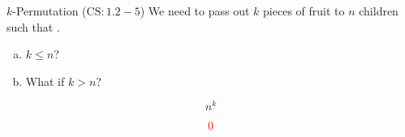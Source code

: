 
\begin{frame}{}
  \begin{exampleblock}{$k$-Permutation ($\text{CS}: 1.2-5$)}
    We need to pass out $k$  pieces of fruit to $n$ children
    such that .

    \begin{enumerate}[(a)]
      \item $k \le n$?
      \item What if $k > n$?
    \end{enumerate}
  \end{exampleblock}

  \[
    n^{\underline{k}}
  \]

  \[
    \textcolor{red}{0}
  \]
\end{frame}
